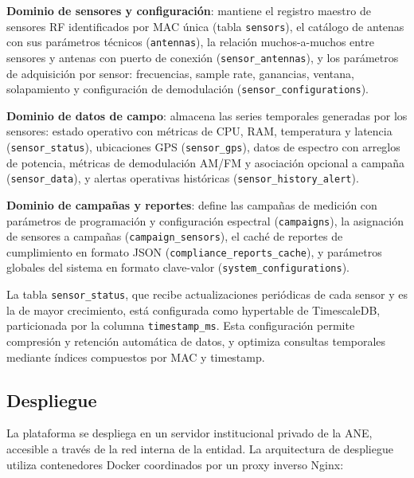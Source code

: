 \textbf{Dominio de sensores y configuración}: mantiene el registro maestro de
sensores RF identificados por MAC única (tabla \texttt{sensors}), el catálogo
de antenas con sus parámetros técnicos (\texttt{antennas}), la relación
muchos-a-muchos entre sensores y antenas con puerto de conexión
(\texttt{sensor\_antennas}), y los parámetros de adquisición por sensor:
frecuencias, sample rate, ganancias, ventana, solapamiento y configuración de
demodulación (\texttt{sensor\_configurations}).

\textbf{Dominio de datos de campo}: almacena las series temporales generadas
por los sensores: estado operativo con métricas de CPU, RAM, temperatura y
latencia (\texttt{sensor\_status}), ubicaciones GPS (\texttt{sensor\_gps}),
datos de espectro con arreglos de potencia, métricas de demodulación AM/FM y
asociación opcional a campaña (\texttt{sensor\_data}), y alertas operativas
históricas (\texttt{sensor\_history\_alert}).

\textbf{Dominio de campañas y reportes}: define las campañas de medición con
parámetros de programación y configuración espectral (\texttt{campaigns}), la
asignación de sensores a campañas (\texttt{campaign\_sensors}), el caché de
reportes de cumplimiento en formato JSON (\texttt{compliance\_reports\_cache}),
y parámetros globales del sistema en formato clave-valor
(\texttt{system\_configurations}).

La tabla \texttt{sensor\_status}, que recibe actualizaciones periódicas de
cada sensor y es la de mayor crecimiento, está configurada como hypertable de
TimescaleDB, particionada por la columna \texttt{timestamp\_ms}. Esta
configuración permite compresión y retención automática de datos, y optimiza
consultas temporales mediante índices compuestos por MAC y timestamp.

\subsection{Despliegue}

La plataforma se despliega en un servidor institucional privado de la ANE,
accesible a través de la red interna de la entidad. La arquitectura de
despliegue utiliza contenedores Docker coordinados por un proxy inverso Nginx:

